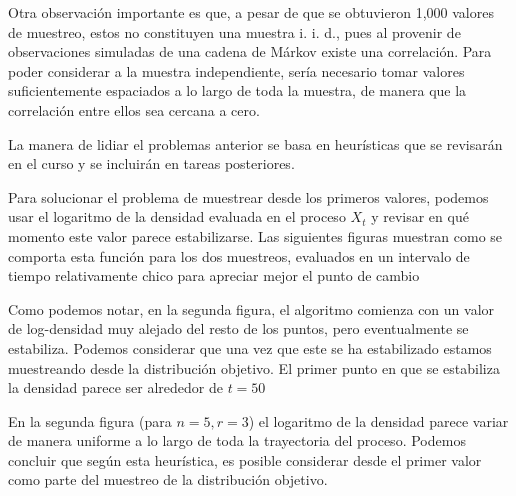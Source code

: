 \documentclass{article}
\begin{document}
\begin{enumerate}

    Otra observación importante es que, a pesar de que se obtuvieron 1,000 valores de muestreo, 
    estos no constituyen una muestra i. i. d., pues al provenir de observaciones simuladas de una cadena
    de Márkov existe una correlación. Para poder considerar a la muestra independiente, sería necesario
    tomar valores suficientemente espaciados a lo largo de toda la muestra, de manera que la correlación
    entre ellos sea cercana a cero. 

    La manera de lidiar el problemas anterior se basa en heurísticas que se revisarán en
    el curso y se incluirán en tareas posteriores. 

    Para solucionar el problema de muestrear desde los primeros valores, podemos usar el logaritmo
    de la densidad evaluada en el proceso $X_t$ y revisar en qué momento este valor parece estabilizarse.
    Las siguientes figuras muestran como se comporta esta función para los dos muestreos, evaluados en un intervalo
    de tiempo relativamente chico para apreciar mejor el punto de cambio

    \begin{center}
        
        
    \end{center}

    Como podemos notar, en la segunda figura, el algoritmo comienza con un valor de log-densidad
    muy alejado del resto de los puntos, pero eventualmente se estabiliza. Podemos considerar
    que una vez que este se ha estabilizado estamos muestreando desde la distribución objetivo.
    El primer punto en que se estabiliza la densidad parece ser alrededor de $t=50$

    En la segunda figura (para $n=5, r=3$) el logaritmo de la densidad parece variar de manera
    uniforme a lo largo de toda la trayectoria del proceso. Podemos concluir que según esta heurística,
    es posible considerar desde el primer valor como parte del muestreo de la distribución
    objetivo.


\end{enumerate}
\end{document}
